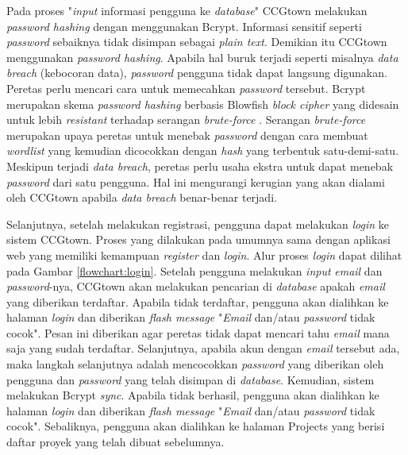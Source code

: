 Pada proses "\textit{input} informasi pengguna ke \textit{database}" CCGtown melakukan
\textit{password hashing} dengan menggunakan Bcrypt.
Informasi sensitif seperti \textit{password} sebaiknya tidak disimpan sebagai
\textit{plain text}. Demikian itu CCGtown menggunakan \textit{password hashing}.
Apabila hal buruk terjadi seperti misalnya \textit{data breach} (kebocoran data),
\textit{password} pengguna tidak dapat langsung digunakan.
Peretas perlu mencari cara untuk memecahkan \textit{password} tersebut.
Bcrypt merupakan skema \textit{password hashing} berbasis Blowfish \textit{block cipher}
yang didesain untuk lebih \textit{resistant} terhadap serangan \textit{brute-force}
\cite{bcrypt}.
Serangan \textit{brute-force} merupakan upaya peretas untuk menebak \textit{password}
dengan cara membuat \textit{wordlist} yang kemudian dicocokkan dengan \textit{hash}
yang terbentuk satu-demi-satu.
Meskipun terjadi \textit{data breach}, peretas perlu usaha ekstra untuk dapat menebak
\textit{password} dari satu pengguna.
Hal ini mengurangi kerugian yang akan dialami oleh CCGtown apabila \textit{data breach}
benar-benar terjadi.

Selanjutnya, setelah melakukan registrasi, pengguna dapat melakukan \textit{login} ke
sistem CCGtown.
Proses yang dilakukan pada umumnya sama dengan aplikasi web yang memiliki
kemampuan \textit{register} dan \textit{login}. Alur proses \textit{login} dapat dilihat
pada Gambar \ref{flowchart:login}.
Setelah pengguna melakukan \textit{input} \textit{email} dan \textit{password}-nya,
CCGtown akan melakukan pencarian di \textit{database} apakah \textit{email} yang
diberikan terdaftar. Apabila tidak terdaftar, pengguna akan dialihkan ke halaman
\textit{login} dan diberikan \textit{flash message} "\textit{Email} dan/atau
\textit{password} tidak cocok". Pesan ini diberikan agar peretas tidak dapat mencari
tahu \textit{email} mana saja yang sudah terdaftar. Selanjutnya, apabila akun
dengan \textit{email} tersebut ada, maka langkah selanjutnya adalah mencocokkan
\textit{password} yang diberikan oleh pengguna dan \textit{password} yang telah
disimpan di \textit{database}. Kemudian, sistem melakukan Bcrypt \textit{sync}.
Apabila tidak berhasil, pengguna akan dialihkan ke halaman \textit{login}
dan diberikan \textit{flash message} "\textit{Email} dan/atau \textit{password}
tidak cocok". Sebaliknya, pengguna akan dialihkan ke halaman Projects yang berisi
daftar proyek yang telah dibuat sebelumnya.

